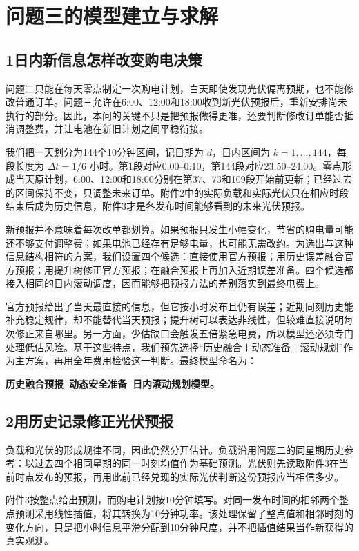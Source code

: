 \documentclass[11pt,a4paper]{article}
\begin{document}
\section*{问题三的模型建立与求解}
\subsection*{1\quad 日内新信息怎样改变购电决策}

问题二只能在每天零点制定一次购电计划，白天即使发现光伏偏离预期，也不能修改普通订单。问题三允许在6:00、12:00和18:00收到新光伏预报后，重新安排尚未执行的部分。因此，本问的关键不只是把预报做得更准，还要判断修改订单能否抵消调整费，并让电池在新旧计划之间平稳衔接。

我们把一天划分为144个10分钟区间，记日期为 $d$，日内区间为 $k=1,\ldots,144$，每段长度为 $\Delta t=1/6$ 小时。第1段对应0:00--0:10，第144段对应23:50--24:00。零点形成当天原计划，6:00、12:00和18:00分别在第37、73和109段开始前更新；已经过去的区间保持不变，只调整未来订单。附件2中的实际负载和实际光伏只在相应时段结束后成为历史信息，附件3才是各发布时间能够看到的未来光伏预报。

新预报并不意味着每次改单都划算。如果预报只发生小幅变化，节省的购电量可能还不够支付调整费；如果电池已经存有足够电量，也可能无需改约。为选出与这种信息结构相符的方案，我们设置四个候选：直接使用官方预报；用历史误差融合官方预报；用提升树修正官方预报；在融合预报上再加入近期误差准备。四个候选都接入相同的日内滚动调度，因而能够把预报方法的差别落实到最终电费上。

官方预报给出了当天最直接的信息，但它按小时发布且仍有误差；近期同刻历史能补充稳定规律，却不能替代当天预报；提升树可以表达非线性，但较难直接说明每次修正来自哪里。另一方面，少估缺口会触发五倍紧急电费，所以模型还必须专门处理低估风险。基于这些特点，我们预先选择“历史融合＋动态准备＋滚动规划”作为主方案，再用全年费用检验这一判断。最终模型命名为：

\textbf{历史融合预报--动态安全准备--日内滚动规划模型。}

\subsection*{2\quad 用历史记录修正光伏预报}

负载和光伏的形成规律不同，因此仍然分开估计。负载沿用问题二的同星期历史参考：以过去四个相同星期的同一时刻均值作为基础预测。光伏则先读取附件3在当前时点发布的预报，再用此前已经兑现的实际光伏判断这份预报应当相信多少。

附件3按整点给出预测，而购电计划按10分钟填写。对同一发布时间的相邻两个整点预测采用线性插值，将其转换为10分钟功率。该处理保留了整点值和相邻时刻的变化方向，只是把小时信息平滑分配到10分钟尺度，并不把插值结果当作新获得的真实观测。
\end{document}
